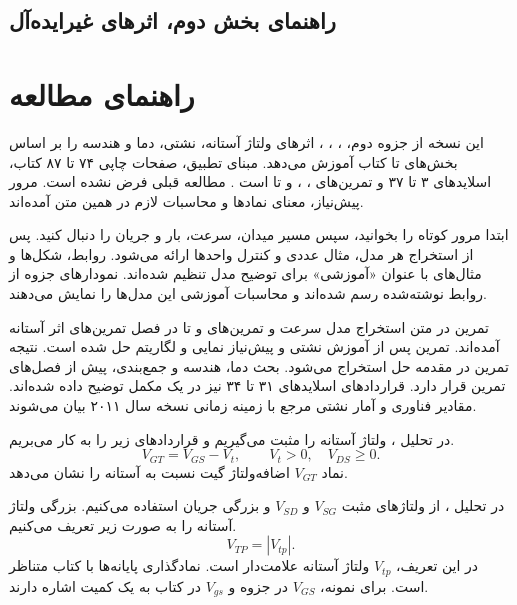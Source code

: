 \ifCompleteNotes
\section*{راهنمای بخش دوم، اثرهای غیرایده‌آل}
\else
\chapter*{راهنمای مطالعه}
\fi
این نسخه از جزوه دوم، ، ،
، اثرهای ولتاژ آستانه، نشتی، دما و هندسه
را بر اساس بخش‌های  تا  کتاب آموزش می‌دهد.
مبنای تطبیق، صفحات چاپی ۷۴ تا ۸۷ کتاب، اسلایدهای ۳ تا ۳۷
 و تمرین‌های ، ،  و
 تا  است
\cite{weste,nonideal}. مطالعه قبلی  فرض نشده است.
مرور پیش‌نیاز، معنای نمادها و محاسبات لازم در همین متن آمده‌اند.

ابتدا مرور کوتاه را بخوانید، سپس مسیر میدان، سرعت، بار و جریان را دنبال کنید.
پس از استخراج هر مدل، مثال عددی و کنترل واحدها ارائه می‌شود. روابط، شکل‌ها و
مثال‌های با عنوان «آموزشی» برای توضیح مدل تنظیم شده‌اند. نمودارهای جزوه از
روابط نوشته‌شده رسم شده‌اند و محاسبات آموزشی این مدل‌ها را نمایش می‌دهند.

تمرین  در متن استخراج مدل سرعت و تمرین‌های  و
 تا  در فصل
تمرین‌های اثر آستانه آمده‌اند. تمرین  پس از آموزش نشتی و پیش‌نیاز
نمایی و لگاریتم حل شده است. نتیجه تمرین  در مقدمه حل  استخراج
می‌شود. بحث دما، هندسه و جمع‌بندی، پیش از فصل‌های تمرین قرار دارد.
قراردادهای  اسلایدهای ۳۱ تا ۳۴ نیز در یک مکمل توضیح داده شده‌اند.
مقادیر فناوری و آمار نشتی مرجع با زمینه زمانی نسخه سال ۲۰۱۱ بیان می‌شوند.

در تحلیل ، ولتاژ آستانه را مثبت می‌گیریم و قراردادهای زیر را
به کار می‌بریم.
\[
 V_{GT}=V_{GS}-V_t,\qquad V_t>0,\quad V_{DS}\ge0.
\]
نماد \(V_{GT}\) اضافه‌ولتاژ گیت نسبت به آستانه را نشان می‌دهد.

در تحلیل ، از ولتاژهای مثبت \(V_{SG}\) و \(V_{SD}\) و بزرگی
جریان استفاده می‌کنیم. بزرگی ولتاژ آستانه را به صورت زیر تعریف می‌کنیم.
\[
 V_{TP}=|V_{tp}|.
\]
در این تعریف، \(V_{tp}\) ولتاژ آستانه علامت‌دار  است.
نمادگذاری پایانه‌ها با کتاب متناظر است. برای نمونه، \(V_{GS}\) در جزوه
و \(V_{gs}\) در کتاب به یک کمیت اشاره دارند.

